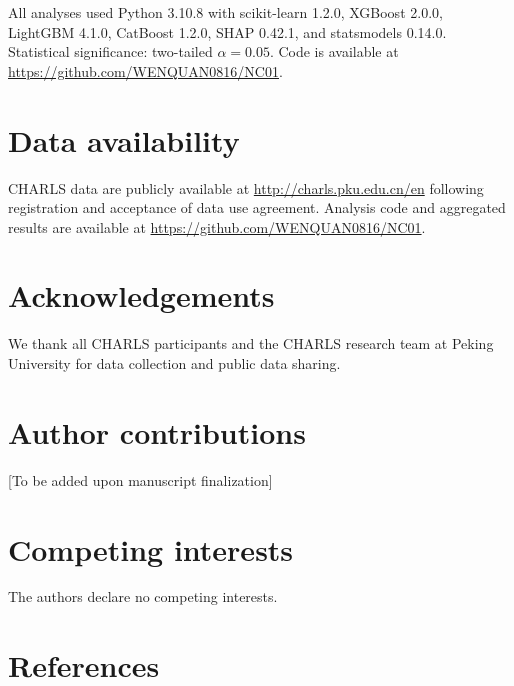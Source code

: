 \documentclass[10pt]{article}
\begin{document}
All analyses used Python 3.10.8 with scikit-learn 1.2.0, XGBoost 2.0.0, LightGBM 4.1.0, CatBoost 1.2.0, SHAP 0.42.1, and statsmodels 0.14.0. Statistical significance: two-tailed $\alpha=0.05$. Code is available at \url{https://github.com/WENQUAN0816/NC01}.

\section*{Data availability}

CHARLS data are publicly available at \url{http://charls.pku.edu.cn/en} following registration and acceptance of data use agreement. Analysis code and aggregated results are available at \url{https://github.com/WENQUAN0816/NC01}.

\section*{Acknowledgements}

We thank all CHARLS participants and the CHARLS research team at Peking University for data collection and public data sharing.

\section*{Author contributions}

[To be added upon manuscript finalization]

\section*{Competing interests}

The authors declare no competing interests.

\section*{References}
\end{document}
